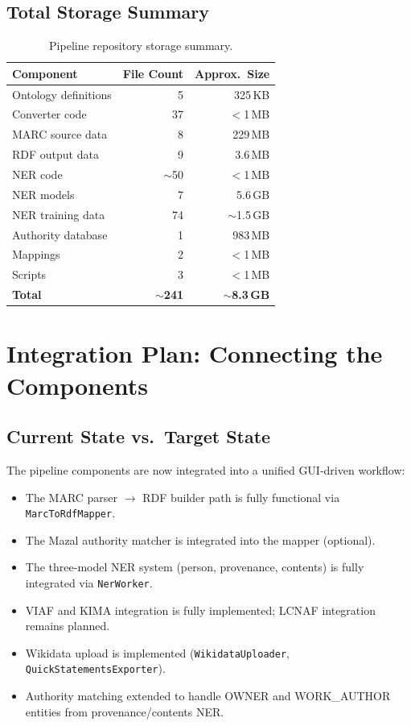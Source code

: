 \documentclass[12pt]{article}
\newcommand{\code}[1]{\texttt{#1}}
\begin{document}
\subsection{Total Storage Summary}

\begin{table}[H]
\centering
\begin{tabular}{lrr}
\toprule
\textbf{Component} & \textbf{File Count} & \textbf{Approx.\ Size} \\
\midrule
Ontology definitions & 5 & 325\,KB \\
Converter code & 37 & $<$1\,MB \\
MARC source data & 8 & 229\,MB \\
RDF output data & 9 & 3.6\,MB \\
NER code & $\sim$50 & $<$1\,MB \\
NER models & 7 & 5.6\,GB \\
NER training data & 74 & $\sim$1.5\,GB \\
Authority database & 1 & 983\,MB \\
Mappings & 2 & $<$1\,MB \\
Scripts & 3 & $<$1\,MB \\
\midrule
\textbf{Total} & \textbf{$\sim$241} & \textbf{$\sim$8.3\,GB} \\
\bottomrule
\end{tabular}
\caption{Pipeline repository storage summary.}
\label{tab:storage-summary}
\end{table}


\section{Integration Plan: Connecting the Components}
\label{sec:integration}

\subsection{Current State vs.\ Target State}

The pipeline components are now integrated into a unified GUI-driven workflow:

\begin{itemize}
\item The MARC parser $\to$ RDF builder path is fully functional via \code{MarcToRdfMapper}.
\item The Mazal authority matcher is integrated into the mapper (optional).
\item The three-model NER system (person, provenance, contents) is fully integrated via \code{NerWorker}.
\item VIAF and KIMA integration is fully implemented; LCNAF integration remains planned.
\item Wikidata upload is implemented (\code{WikidataUploader}, \code{QuickStatementsExporter}).
\item Authority matching extended to handle OWNER and WORK\_AUTHOR entities from provenance/contents NER.
\end{itemize}
\end{document}
